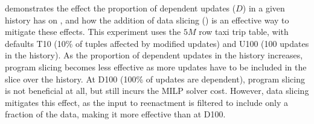 


\label{sec:exp-dep}
%
 demonstrates the effect the proportion of dependent updates ($D$) in a given history has on \mrp, and how the addition of data slicing (\mrdp) is an effective way to mitigate these effects. This experiment uses the $5M$ row taxi trip table, with defaults T10 (10\% of tuples affected by modified updates) and U100 (100 updates in the history). As the proportion of dependent updates in the history increases, program slicing becomes less effective as more updates have to be included in the slice over the history. At D100 (100\% of updates are dependent), program slicing is not beneficial at all, but still incurs the MILP solver cost. However, data slicing  mitigates this effect, as the input to reenactment is filtered to include only a fraction of the data, making it more effective than \mrp at D100.

